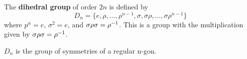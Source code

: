 \begin{definition}
    The \textbf{dihedral group} of order $2n$ is defined by $$D_n = \{e, \rho, \dots, \rho^{n-1}, \sigma, \sigma\rho, \dots, \sigma\rho^{n - 1}\}$$ where $p^n = e$, $\sigma^2 = e$, and $\sigma\rho\sigma = \rho^{-1}$.
    This is a group with the multiplication given by $\sigma\rho\sigma = \rho^{-1}$.
\end{definition}

\begin{remark}
    $D_n$ is the group of symmetries of a regular n-gon.
\end{remark}
